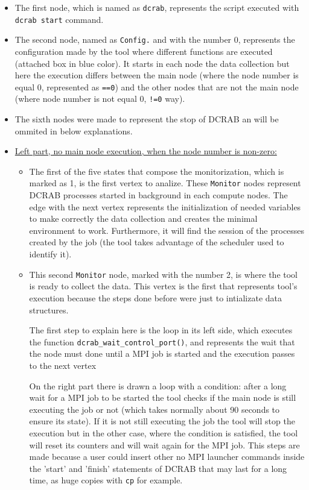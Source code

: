 \documentclass[10pt,a4paper]{report}
\begin{document}
\begin{itemize}
  \item The first node, which is named as \verb+dcrab+, represents the script executed with \verb+dcrab start+ command.
  \item The second node, named as \verb+Config.+ and with the number 0, represents the configuration made by the tool where different functions are executed (attached box in blue color). It starts in each node the data collection but here the execution differs between the main node (where the node number is equal 0, represented as \verb+==0+) and the other nodes that are not the main node (where node number is not equal 0, \verb+!=0+ way).
  \item The sixth nodes were made to represent the stop of DCRAB an will be ommited in below explanations.
  \item \underline{Left part, no main node execution, when the node number is non-zero:}
  \begin{itemize}
    \item The first of the five states that compose the monitorization, which is marked as 1, is the first vertex to analize. These \verb+Monitor+ nodes represent DCRAB processes started in background in each compute nodes. The edge with the next vertex represents the initialization of needed variables to make correctly the data collection and creates the minimal environment to work. Furthermore, it will find the session of the processes created by the job (the tool takes advantage of the scheduler used to identify it).
    \item This second \verb+Monitor+ node, marked with the number 2, is where the tool is ready to collect the data. This vertex is the first that represents tool's execution because the steps done before were just to intializate data structures.

    The first step to explain here is the loop in its left side, which executes the function \texttt{dcrab\_wait\_control\_port()}, and represents the wait that the node must done until a MPI job is started and the execution passes to the next vertex

   On the right part there is drawn a loop with a condition: after a long wait for a MPI job to be started the tool checks if the main node is still executing the job or not (which takes normally about 90 seconds to ensure its state). If it is not still executing the job the tool will stop the execution but in the other case, where the condition is satisfied, the tool will reset its counters and will wait again for the MPI job. This steps are made because a user could insert other no MPI launcher commands inside the 'start' and 'finish' statements of DCRAB that may last for a long time, as huge copies with \verb+cp+ for example.


\end{itemize}
\end{itemize}
\end{document}
